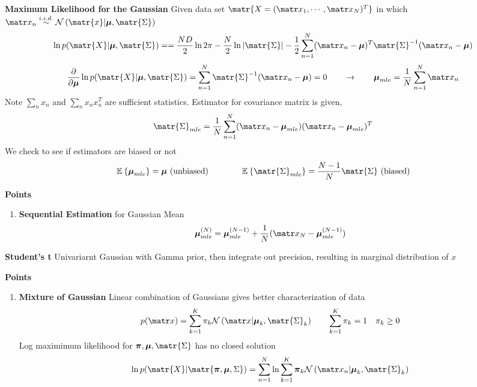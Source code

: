 \documentclass[11pt]{article}
\begin{document}
\begin{defn*}
    \textbf{Maximum Likelihood for the Gaussian} Given data set $\matr{X = (\bx_1, \cdots, \bx_N)^T}$ in which $\bx_n \overset{i.i.d.}{\sim} \normal{\matr{x}| \bmu, \matr{\Sigma}}$
    \[
        \ln{p(\matr{X}|\bmu, \matr{\Sigma})} = 
        = \frac{ND}{2} \ln{2\pi} - \frac{N}{2} \ln{|\matr{\Sigma}|} - \frac{1}{2} \sum_{n=1}^N (\bx_n - \bmu)^T \matr{\Sigma}^{-1}(\bx_n - \bmu)
    \]
    \[
        \frac{\partial}{\partial \bmu}  \ln{p(\matr{X}|\bmu, \matr{\Sigma})} = 
        \sum_{n=1}^N \matr{\Sigma}^{-1} (\bx_n - \bmu) = 0
        \quad \quad \rightarrow \quad \quad 
        \bmu_{mle} = \frac{1}{N}\sum_{n=1}^N \bx_n
    \]
    Note $\textstyle\sum_n x_n$ and $\textstyle \sum_n x_n x_n^T$ are sufficient statistics. Estimator for covariance matrix is given,
    \[
        \matr{\Sigma}_{mle} = \frac{1}{N}\sum_{n=1}^N (\bx_n - \bmu_{mle})(\bx_n - \bmu_{mle})^T
    \]
    We check to see if estimators are biased or not 
    \[
        \E{\bmu_{mle}} = \bmu \text{ (unbiased)}
        \quad \quad \quad \quad 
        \E{\matr{\Sigma}_{mle}} = \frac{N-1}{N} \matr{\Sigma} \text{ (biased)}
    \]
\end{defn*}




\begin{defn*}
    \textbf{Points}
    \begin{enumerate}
        \item \textbf{Sequential Estimation} for Gaussian Mean 
        \[
            \bmu_{mle}^{(N)} = \bmu_{mle}^{(N-1)} + \frac{1}{N} (\bx_N - \bmu_{mle}^{(N-1)})
        \]
    \end{enumerate}
\end{defn*}



\begin{defn*}
    \textbf{Student's t} Univariarnt Gaussian with Gamma prior, then integrate out precision, resulting in marginal distribution of $x$
\end{defn*}




\begin{defn*}
    \textbf{Points}
    \begin{enumerate}
        \item \textbf{Mixture of Gaussian} Linear combination of Gaussians gives better characterization of data
        \[
            p(\bx) = \sum_{k=1}^K \pi_k \normal{\bx|\bmu_k, \matr{\Sigma}_k}    
            \qquad 
            \sum_{k=1}^K \pi_k = 1
            \quad 
            \pi_k \geq 0
        \]
        Log maximimum likelihood for $\boldsymbol{\pi}, \bmu, \matr{\Sigma}$ has no closed solution
        \[
            \ln{p(\matr{X}| \matr{\boldsymbol{\pi}, \bmu, \Sigma})} = 
            \sum_{n=1}^N \ln{\sum_{k=1}^K \boldsymbol{\pi}_k \normal{\bx_n | \bmu_k , \matr{\Sigma}_k}}
        \]
    \end{enumerate}
\end{defn*}
\end{document}
